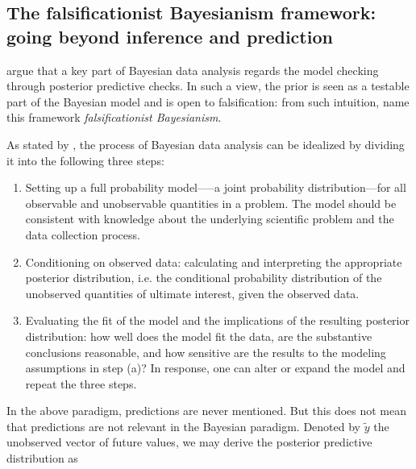 \documentclass{statsoc}
\begin{document}

\subsection{The falsificationist Bayesianism framework: going beyond inference and prediction}

\cite{gelman2013philosophy} argue that a key part of Bayesian data analysis regards the model checking through posterior predictive checks. In such a view, the prior is seen as a testable part of the Bayesian model and is open to falsification: from such intuition, \cite{gelman2017beyond} name this framework \emph{falsificationist Bayesianism}.

As stated by \cite{gelman2013bayesian}, the process of Bayesian data analysis can be idealized by dividing it into the following three steps:

\begin{enumerate}
\item Setting up a full probability model—--a joint probability distribution---for all observable and unobservable quantities 
           in a problem. The model should be consistent with knowledge about the underlying scientific problem and the data collection 
           process.
\item Conditioning on observed data: calculating and interpreting the appropriate posterior distribution, i.e. the conditional probability 
           distribution of the unobserved quantities of ultimate interest, given the observed data.
\item Evaluating the fit of the model and the implications of the resulting posterior distribution: how well does the model fit the 
           data, are the substantive conclusions reasonable, and how sensitive are the results to the modeling assumptions in step (a)? 
           In response, one can alter or expand the model and repeat the three steps.
\end{enumerate}
%
In the above paradigm, predictions are never mentioned. But this does not mean that predictions are not relevant in the Bayesian paradigm. Denoted by $\tilde{y}$ the unobserved vector of future values, we may derive the posterior predictive distribution as
\end{document}
